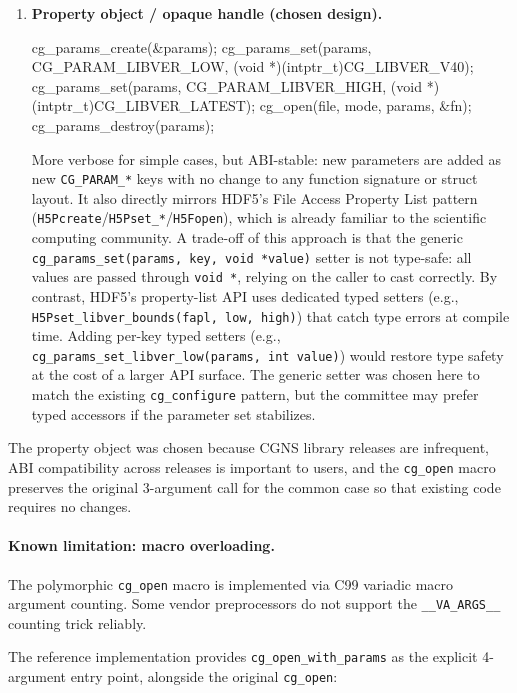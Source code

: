\documentclass[11pt,letterpaper]{article}
\makeatletter
\let\cgns@orig@lstlisting\lstlisting
\let\cgns@endorig@lstlisting\endlstlisting
\renewenvironment{lstlisting}
  {\par\needspace{5\baselineskip}\nolinenumbers\cgns@orig@lstlisting}
  {\cgns@endorig@lstlisting\par\linenumbers}
\makeatother
\begin{document}
\begin{enumerate}[leftmargin=2em]
\item \textbf{Property object / opaque handle (chosen design).}
\begin{lstlisting}[language=C]
cg_params_create(&params);
cg_params_set(params, CG_PARAM_LIBVER_LOW,
              (void *)(intptr_t)CG_LIBVER_V40);
cg_params_set(params, CG_PARAM_LIBVER_HIGH,
              (void *)(intptr_t)CG_LIBVER_LATEST);
cg_open(file, mode, params, &fn);
cg_params_destroy(params);
\end{lstlisting}
More verbose for simple cases, but ABI-stable: new parameters are
added as new \texttt{CG\_PARAM\_*} keys with no change to any
function signature or struct layout.  It also directly mirrors HDF5's
File Access Property List pattern
(\texttt{H5Pcreate}/\texttt{H5Pset\_*}/\texttt{H5Fopen}), which is
already familiar to the scientific computing community.
A trade-off of this approach is that the generic
\texttt{cg\_params\_set(params, key, void~*value)} setter is not
type-safe: all values are passed through \texttt{void~*}, relying on
the caller to cast correctly.  By contrast, HDF5's property-list API
uses dedicated typed setters (e.g.,
\texttt{H5Pset\_libver\_bounds(fapl, low, high)}) that catch type
errors at compile time.  Adding per-key typed setters
(e.g., \texttt{cg\_params\_set\_libver\_low(params, int~value)}) would
restore type safety at the cost of a larger API surface.  The generic
setter was chosen here to match the existing \texttt{cg\_configure}
pattern, but the committee may prefer typed accessors if the parameter
set stabilizes.

\end{enumerate}

The property object was chosen because CGNS library releases are
infrequent, ABI compatibility across releases is important to users,
and the \texttt{cg\_open} macro preserves the original 3-argument
call for the common case so that existing code requires no changes.

\paragraph{Known limitation: macro overloading.}
The polymorphic \texttt{cg\_open} macro is implemented via C99
variadic macro argument counting.  Some vendor preprocessors do not
support the \texttt{\_\_VA\_ARGS\_\_} counting trick reliably.

The reference implementation provides
\texttt{cg\_open\_with\_params} as the explicit 4-argument entry
point, alongside the original \texttt{cg\_open}:
\end{document}
